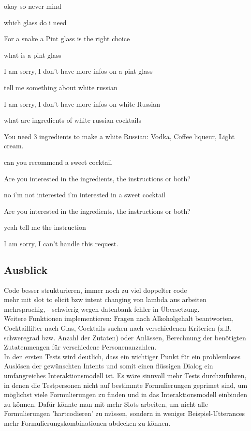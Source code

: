 \documentclass[12pt,letterpaper]{article}
\begin{document}
\begin{dialogue}
 okay so never mind

 which glass do i need

 For a snake a Pint glass is the right choice

 what is a pint glass

 I am sorry, I don't have more infos on a pint glass

 tell me something about white russian

 I am sorry, I don't have more infos on white Russian

 what are ingredients of white russian cocktails

 You need 3 ingredients to make a white Russian: Vodka, Coffee liqueur, Light cream.

 can you recommend a sweet cocktail

 Are you interested in the ingredients, the instructions or both?

 no i'm not interested i'm interested in a sweet cocktail

 Are you interested in the ingredients, the instructions or both?

 yeah tell me the instruction

 I am sorry, I can't handle this request.
\end{dialogue}
\subsection{Ausblick}
Code besser strukturieren, immer noch zu viel doppelter code\\
mehr mit slot to elicit bzw intent changing von lambda aus arbeiten\\
mehrsprachig, - schwierig wegen datenbank fehler in Übersetzung.\\
Weitere Funktionen implementieren: Fragen nach Alkoholgehalt beantworten, Cocktailfilter nach Glas, Cocktails suchen nach verschiedenen Kriterien (z.B. schweregrad bzw. Anzahl der Zutaten) oder Anlässen, Berechnung der benötigten Zutatenmengen für verschiedene Personenanzahlen. \\
In den ersten Tests wird deutlich, dass ein wichtiger Punkt für ein problemloses Auslösen der gewünschten Intents und somit einen flüssigen Dialog ein umfangreiches Interaktionsmodell ist. Es wäre sinnvoll mehr Tests durchzuführen, in denen die Testpersonen nicht auf bestimmte Formulierungen geprimet sind, um möglichst viele Formulierungen zu finden und in das Interaktionsmodell einbinden zu können. Dafür könnte man mit mehr Slots arbeiten, um nicht alle Formulierungen 'hartcodieren' zu müssen, sondern in weniger Beispiel-Utterances mehr Formulierungskombinationen abdecken zu können.
\end{document}
